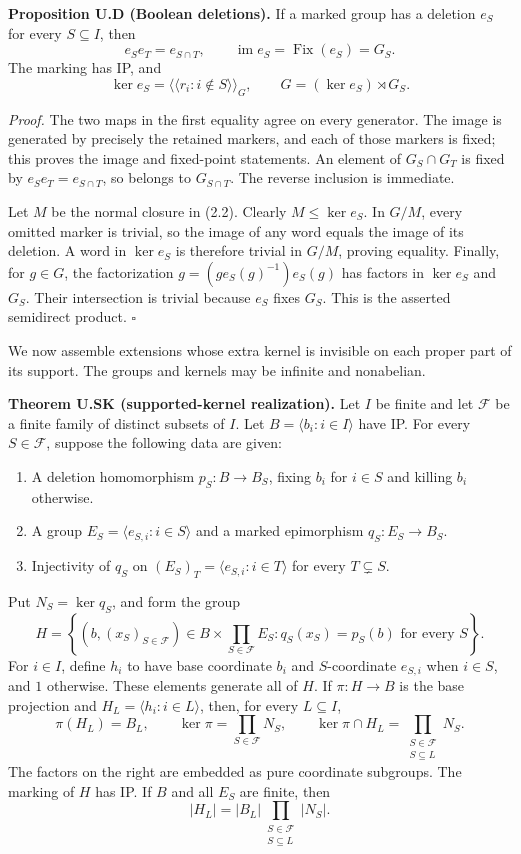 \documentclass[
  11pt,
  a4paper,
]{article}
\providecommand{\tightlist}{%
  \setlength{\itemsep}{0pt}\setlength{\parskip}{0pt}}
\begin{document}
\textbf{Proposition U.D (Boolean deletions).} If a marked group has a
deletion \(e_S\) for every \(S\subseteq I\), then \[
e_Se_T=e_{S\cap T},\qquad \operatorname{im}e_S=\operatorname{Fix}(e_S)=G_S.
\tag{2.1}
\] The marking has IP, and \[
\ker e_S=\langle\!\langle r_i:i\notin S\rangle\!\rangle_G,
\qquad G=(\ker e_S)\rtimes G_S.
\tag{2.2}
\]

\emph{Proof.} The two maps in the first equality agree on every
generator. The image is generated by precisely the retained markers, and
each of those markers is fixed; this proves the image and fixed-point
statements. An element of \(G_S\cap G_T\) is fixed by
\(e_Se_T=e_{S\cap T}\), so belongs to \(G_{S\cap T}\). The reverse
inclusion is immediate.

Let \(M\) be the normal closure in (2.2). Clearly \(M\leq\ker e_S\). In
\(G/M\), every omitted marker is trivial, so the image of any word
equals the image of its deletion. A word in \(\ker e_S\) is therefore
trivial in \(G/M\), proving equality. Finally, for \(g\in G\), the
factorization \(g=(g e_S(g)^{-1})e_S(g)\) has factors in \(\ker e_S\)
and \(G_S\). Their intersection is trivial because \(e_S\) fixes
\(G_S\). This is the asserted semidirect product. \(\square\)

We now assemble extensions whose extra kernel is invisible on each
proper part of its support. The groups and kernels may be infinite and
nonabelian.

\textbf{Theorem U.SK (supported-kernel realization).} Let \(I\) be
finite and let \(\mathcal F\) be a finite family of distinct subsets of
\(I\). Let \(B=\langle b_i:i\in I\rangle\) have IP. For every
\(S\in\mathcal F\), suppose the following data are given:

\begin{enumerate}
\def\labelenumi{\arabic{enumi}.}
\tightlist
\item
  A deletion homomorphism \(p_S:B\to B_S\), fixing \(b_i\) for
  \(i\in S\) and killing \(b_i\) otherwise.
\item
  A group \(E_S=\langle e_{S,i}:i\in S\rangle\) and a marked epimorphism
  \(q_S:E_S\to B_S\).
\item
  Injectivity of \(q_S\) on \((E_S)_T=\langle e_{S,i}:i\in T\rangle\)
  for every \(T\subsetneq S\).
\end{enumerate}

Put \(N_S=\ker q_S\), and form the group \[
H=\left\{(b,(x_S)_{S\in\mathcal F})\in
B\times\prod_{S\in\mathcal F}E_S:
q_S(x_S)=p_S(b)\text{ for every }S\right\}.
\tag{2.3}
\] For \(i\in I\), define \(h_i\) to have base coordinate \(b_i\) and
\(S\)-coordinate \(e_{S,i}\) when \(i\in S\), and \(1\) otherwise. These
elements generate all of \(H\). If \(\pi:H\to B\) is the base projection
and \(H_L=\langle h_i:i\in L\rangle\), then, for every \(L\subseteq I\),
\[
\pi(H_L)=B_L,\qquad
\ker\pi=\prod_{S\in\mathcal F}N_S,\qquad
\ker\pi\cap H_L=\prod_{\substack{S\in\mathcal F\\S\subseteq L}}N_S.
\tag{2.4}
\] The factors on the right are embedded as pure coordinate subgroups.
The marking of \(H\) has IP. If \(B\) and all \(E_S\) are finite, then
\[
|H_L|=|B_L|\prod_{\substack{S\in\mathcal F\\S\subseteq L}}|N_S|.
\tag{2.5}
\]
\end{document}
